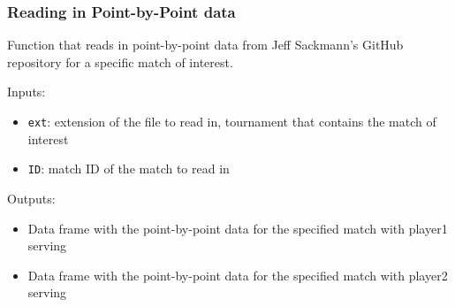 \documentclass[
  letterpaper,
  DIV=11,
  numbers=noendperiod]{scrartcl}
\providecommand{\tightlist}{%
  \setlength{\itemsep}{0pt}\setlength{\parskip}{0pt}}\usepackage{longtable,booktabs,array}
\begin{document}
\linespread{2}

\subsubsection{Reading in Point-by-Point
data}\label{reading-in-point-by-point-data}

Function that reads in point-by-point data from Jeff Sackmann's GitHub
repository for a specific match of interest.

Inputs:

\begin{itemize}
\tightlist
\item
  \texttt{ext}: extension of the file to read in, tournament that
  contains the match of interest
\item
  \texttt{ID}: match ID of the match to read in
\end{itemize}

Outputs:

\begin{itemize}
\tightlist
\item
  Data frame with the point-by-point data for the specified match with
  player1 serving
\item
  Data frame with the point-by-point data for the specified match with
  player2 serving
\end{itemize}

\linespread{0.9}
\end{document}
